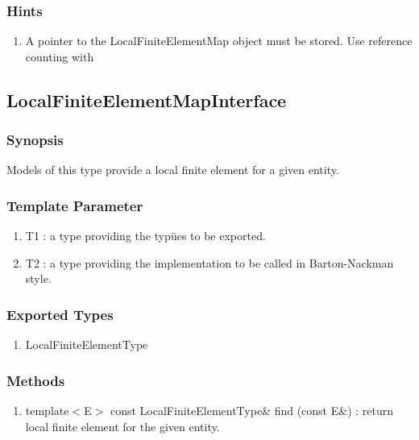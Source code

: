 \documentclass[11pt,a4paper,DIV11,%
notitlepage,oneside,abstracton,%
bibtotoc]{scrartcl}
\begin{document}
\subsubsection{Hints}

\begin{enumerate}[1)]
\item A pointer to the LocalFiniteElementMap object must be
  stored. Use reference counting with  
\end{enumerate}

\subsection{LocalFiniteElementMapInterface}

\subsubsection{Synopsis}

Models of this type provide a local finite element for a given
entity. 

\subsubsection{Template Parameter}

\begin{enumerate}[1)]
\item T1 : a type providing the typües to be exported.
\item T2 : a type providing the implementation to be called in
  Barton-Nackman style.
\end{enumerate}

\subsubsection{Exported Types}

\begin{enumerate}[1)]
\item LocalFiniteElementType
\end{enumerate}

\subsubsection{Methods}

\begin{enumerate}[1)]
\item template$<$E$>$ const LocalFiniteElementType\& find (const E\&)
  : return local finite element for the given entity.
\end{enumerate}
\end{document}
